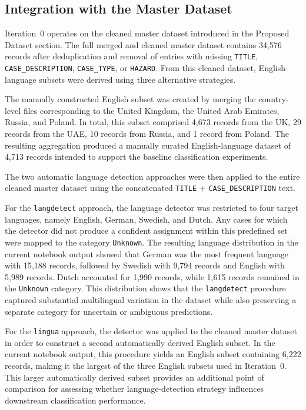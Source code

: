 \documentclass[11pt, titlepage, bibliography=totoc]{scrreprt}
\begin{document}
\subsection{Integration with the Master Dataset}

Iteration~0 operates on the cleaned master dataset introduced in the Proposed Dataset section. The full merged and cleaned master dataset contains 34,576 records after deduplication and removal of entries with missing \texttt{TITLE}, \texttt{CASE\_DESCRIPTION}, \texttt{CASE\_TYPE}, or \texttt{HAZARD}. From this cleaned dataset, English-language subsets were derived using three alternative strategies.

The manually constructed English subset was created by merging the country-level files corresponding to the United Kingdom, the United Arab Emirates, Russia, and Poland. In total, this subset comprised 4,673 records from the UK, 29 records from the UAE, 10 records from Russia, and 1 record from Poland. The resulting aggregation produced a manually curated English-language dataset of 4,713 records intended to support the baseline classification experiments.

The two automatic language detection approaches were then applied to the entire cleaned master dataset using the concatenated \texttt{TITLE} + \texttt{CASE\_DESCRIPTION} text.

For the \texttt{langdetect} approach, the language detector was restricted to four target languages, namely English, German, Swedish, and Dutch. Any cases for which the detector did not produce a confident assignment within this predefined set were mapped to the category \texttt{Unknown}. The resulting language distribution in the current notebook output showed that German was the most frequent language with 15,188 records, followed by Swedish with 9,794 records and English with 5,989 records. Dutch accounted for 1,990 records, while 1,615 records remained in the \texttt{Unknown} category. This distribution shows that the \texttt{langdetect} procedure captured substantial multilingual variation in the dataset while also preserving a separate category for uncertain or ambiguous predictions.

For the \texttt{lingua} approach, the detector was applied to the cleaned master dataset in order to construct a second automatically derived English subset. In the current notebook output, this procedure yields an English subset containing 6,222 records, making it the largest of the three English subsets used in Iteration~0. This larger automatically derived subset provides an additional point of comparison for assessing whether language-detection strategy influences downstream classification performance.
\end{document}
